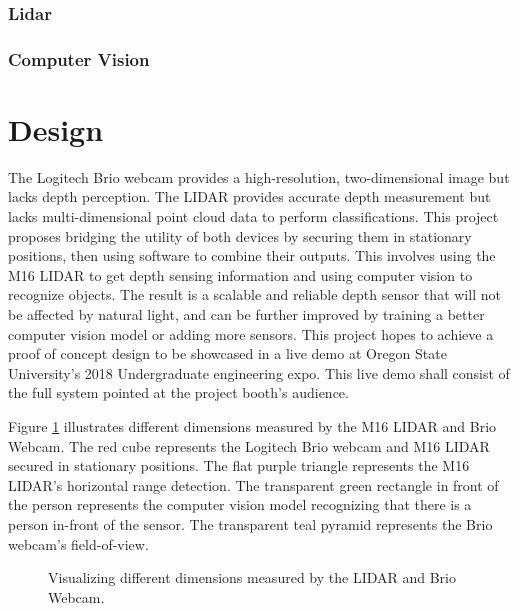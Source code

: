 \documentclass{article}
\begin{document}
    \subsubsection{Lidar}

    \subsubsection{Computer Vision}

\section{Design}
\label{sec:Design}
    The Logitech Brio webcam provides a high-resolution, two-dimensional image but lacks depth perception.
		The LIDAR provides accurate depth measurement but lacks multi-dimensional point cloud data to perform classifications.
		This project proposes bridging the utility of both devices by securing them in stationary positions, then using software to combine their outputs.
		This involves using the M16 LIDAR to get depth sensing information and using computer vision to recognize objects.
		The result is a scalable and reliable depth sensor that will not be affected by natural light, and can be further improved by training a better computer vision model or adding more sensors.
		This project hopes to achieve a proof of concept design to be showcased in a live demo at Oregon State University's 2018 Undergraduate engineering expo.			
		This live demo shall consist of the full system pointed at the project booth's audience. 

		Figure \ref{fig:fig1}  illustrates different dimensions measured by the M16 LIDAR and Brio Webcam.
		The red cube represents the Logitech Brio webcam and M16 LIDAR secured in stationary positions.
		The flat purple triangle represents the M16 LIDAR's horizontal range detection.
		The transparent green rectangle in front of the person represents the computer vision model recognizing that there is a person in-front of the sensor.
    The transparent teal pyramid represents the Brio webcam's field-of-view.

    \begin{figure}
      \centering
      \caption{Visualizing different dimensions measured by the LIDAR and Brio Webcam.}
      \label{fig:fig1}
    \end{figure}
\end{document}
